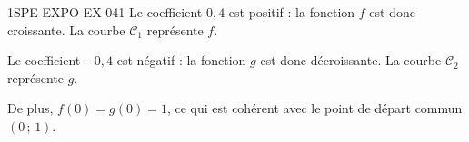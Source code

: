 \begin{corrige}{1SPE-EXPO-EX-041}
Le coefficient $0{,}4$ est positif : la fonction $f$ est donc croissante. La courbe $\mathcal C_1$ représente $f$.

Le coefficient $-0{,}4$ est négatif : la fonction $g$ est donc décroissante. La courbe $\mathcal C_2$ représente $g$.

De plus, $f(0)=g(0)=1$, ce qui est cohérent avec le point de départ commun $(0\,;\,1)$.
\end{corrige}
